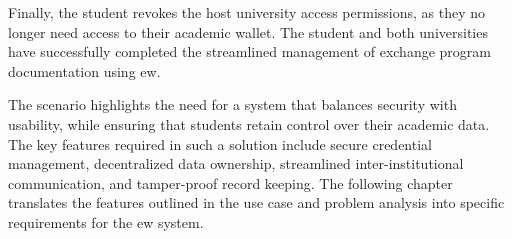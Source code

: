 Finally, the student revokes the host university access permissions, as they no longer need access to their academic wallet. The student and both universities have successfully completed the streamlined management of exchange program documentation using \gls{ew}. 

The scenario highlights the need for a system that balances security with usability, while ensuring that students retain control over their academic data. The key features required in such a solution include secure credential management, decentralized data ownership, streamlined inter-institutional communication, and tamper-proof record keeping. The following chapter translates the features outlined in the use case and problem analysis into specific requirements for the \gls{ew} system.